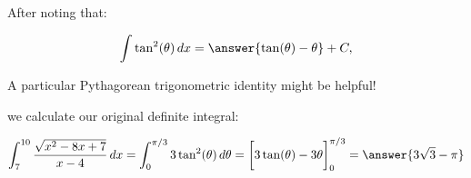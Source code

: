 \documentclass{ximera}
\begin{document}
\begin{exercise}
\begin{exercise}
\begin{exercise}
\begin{hint}
\end{hint}

After noting that:

\[
\int \tan^2(\theta) \d x = \answer{\tan(\theta)-\theta}+C,
\]

\begin{hint}
A particular Pythagorean trigonometric identity might be helpful!
\end{hint}

we calculate our original definite integral: 

\[
\int_{7}^{10} \frac{\sqrt{x^{2}-8x+7}}{x-4} \d x=\int_{0}^{\pi/3} 3\tan^{2}(\theta) \d \theta= \eval{3\tan(\theta)-3\theta}_0^{\pi/3} = \answer{3\sqrt{3}-\pi}
\]


\end{exercise}
\end{exercise}
\end{exercise}
\end{document}
